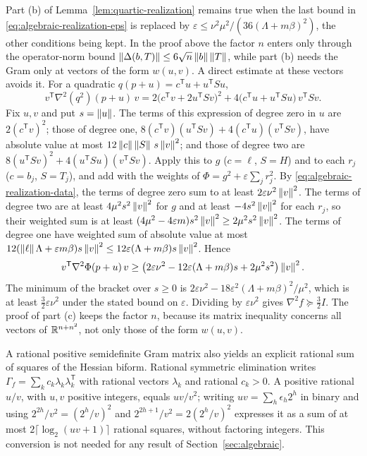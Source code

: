 \begin{remark}
\label{rem:algebraic-curvature}
Part (b) of Lemma~\ref{lem:quartic-realization} remains true when the last
bound in \eqref{eq:algebraic-realization-eps} is replaced by
$\varepsilon\le\nu^2\mu^2/(36(\Lambda+m\beta)^2)$, the other conditions being
kept. In the proof above the factor $n$ enters only through the operator-norm
bound $\left\lVert\Delta(b,T)\right\rVert\le6\sqrt n\left\lVert b\right\rVert\left\lVert T\right\rVert$, while part (b) needs the
Gram only at vectors of the form $w(u,v)$. A direct estimate at these vectors
avoids it. For a quadratic $q(p+u)=c^{\mathsf T}u+u^{\mathsf T}Su$,
\[
 v^{\mathsf T}\nabla^2(q^2)(p+u)\,v
 =2\bigl(c^{\mathsf T}v+2u^{\mathsf T}Sv\bigr)^2
 +4\bigl(c^{\mathsf T}u+u^{\mathsf T}Su\bigr)\,v^{\mathsf T}Sv .
\]
Fix $u,v$ and put $s=\left\lVert u\right\rVert$. The terms of this expression of degree zero
in $u$ are $2(c^{\mathsf T}v)^2$; those of degree one,
$8(c^{\mathsf T}v)(u^{\mathsf T}Sv)+4(c^{\mathsf T}u)(v^{\mathsf T}Sv)$, have
absolute value at most $12\left\lVert c\right\rVert\left\lVert S\right\rVert\,s\left\lVert v\right\rVert^2$; and those of degree
two are $8(u^{\mathsf T}Sv)^2+4(u^{\mathsf T}Su)(v^{\mathsf T}Sv)$. Apply this
to $g$ ($c=\ell$, $S=H$) and to each $r_j$ ($c=b_j$, $S=T_j$), and add with the
weights of $\Phi=g^2+\varepsilon\sum_jr_j^2$. By
\eqref{eq:algebraic-realization-data}, the terms of degree zero sum to at
least $2\varepsilon\nu^2\left\lVert v\right\rVert^2$. The terms of degree two are at least
$4\mu^2s^2\left\lVert v\right\rVert^2$ for $g$ and at least $-4s^2\left\lVert v\right\rVert^2$ for each $r_j$, so
their weighted sum is at least $(4\mu^2-4\varepsilon m)s^2\left\lVert v\right\rVert^2\ge
2\mu^2s^2\left\lVert v\right\rVert^2$. The terms of degree one have weighted sum of absolute
value at most $12(\left\lVert\ell\right\rVert\Lambda+\varepsilon m\beta)s\left\lVert v\right\rVert^2\le
12\varepsilon(\Lambda+m\beta)s\left\lVert v\right\rVert^2$. Hence
\[
 v^{\mathsf T}\nabla^2\Phi(p+u)\,v\ge
 \bigl(2\varepsilon\nu^2-12\varepsilon(\Lambda+m\beta)s+2\mu^2s^2\bigr)
 \left\lVert v\right\rVert^2 .
\]
The minimum of the bracket over $s\ge0$ is
$2\varepsilon\nu^2-18\varepsilon^2(\Lambda+m\beta)^2/\mu^2$, which is at least
$\frac32\varepsilon\nu^2$ under the stated bound on $\varepsilon$. Dividing by
$\varepsilon\nu^2$ gives $\nabla^2f\succeq\frac32I$. The proof of part (c)
keeps the factor $n$, because its matrix inequality concerns all vectors of
$\mathbb R^{n+n^2}$, not only those of the form $w(u,v)$.
\end{remark}

A rational positive semidefinite Gram matrix also yields an explicit rational
sum of squares of the Hessian biform. Rational symmetric elimination writes
$\Gamma_f=\sum_kc_k\lambda_k\lambda_k^{\mathsf T}$ with rational vectors
$\lambda_k$ and rational $c_k>0$. A positive rational $u/v$, with $u,v$
positive integers, equals $uv/v^2$; writing $uv=\sum_h\epsilon_h2^h$ in binary
and using $2^{2h}/v^2=(2^h/v)^2$ and $2^{2h+1}/v^2=2(2^h/v)^2$ expresses it as
a sum of at most $2\lceil\log_2(uv+1)\rceil$ rational squares, without
factoring integers. This conversion is not needed for any result of
Section~\ref{sec:algebraic}.

